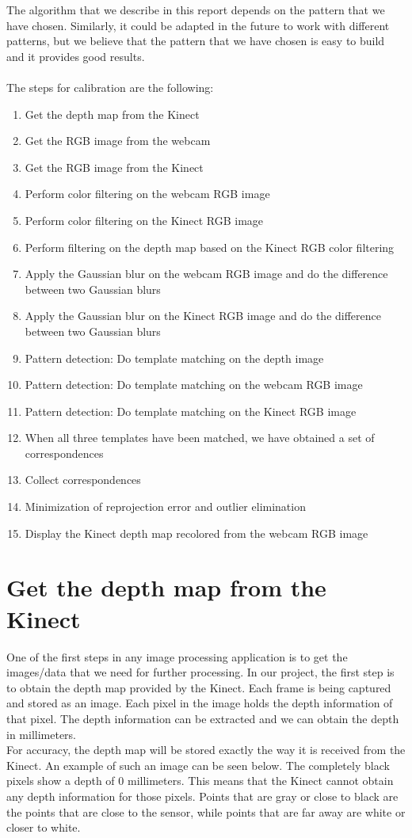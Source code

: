 \noindent
The algorithm that we describe in this report depends on the pattern that we have chosen. Similarly, it could be adapted in the future to work with different patterns, but we believe that the pattern that we have chosen is easy to build and it provides good results. 
\\\\
The steps for calibration are the following:
\begin{enumerate}
	\item Get the depth map from the Kinect
	\item Get the RGB image from the webcam
	\item Get the RGB image from the Kinect
	\item Perform color filtering on the webcam RGB image
	\item Perform color filtering on the Kinect RGB image
	\item Perform filtering on the depth map based on the Kinect RGB color filtering 
	\item Apply the Gaussian blur on the webcam RGB image and do the difference between two Gaussian blurs
	\item Apply the Gaussian blur on the Kinect RGB image and do the difference between two Gaussian blurs
	\item Pattern detection: Do template matching on the depth image
	\item Pattern detection: Do template matching on the webcam RGB image
	\item Pattern detection: Do template matching on the Kinect RGB image
	\item When all three templates have been matched, we have obtained a set of correspondences
	\item Collect correspondences
	\item Minimization of reprojection error and outlier elimination
	\item Display the Kinect depth map recolored from the webcam RGB image 	
\end{enumerate}

\section{Get the depth map from the Kinect}
\noindent
One of the first steps in any image processing application is to get the images/data that we need for further processing. In our project, the first step is to obtain the depth map provided by the Kinect. Each frame is being captured and stored as an image. Each pixel in the image holds the depth information of that pixel. The depth information can be extracted and we can obtain the depth in millimeters.
\\
For accuracy, the depth map will be stored exactly the way it is received from the Kinect. An example of such an image can be seen below. The completely black pixels show a depth of 0 millimeters. This means that the Kinect cannot obtain any depth information for those pixels. Points that are gray or close to black are the points that are close to the sensor, while points that are far away are white or closer to white. 

